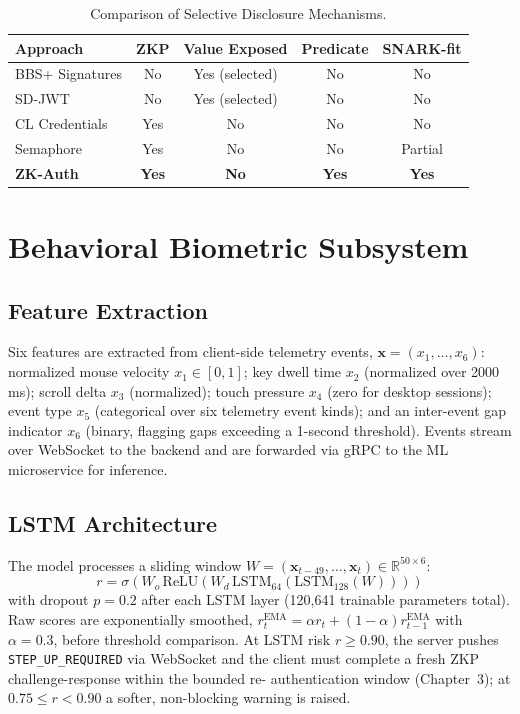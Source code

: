 \documentclass[12pt,a4paper,oneside]{report}
\begin{document}
\begin{table}[htbp]
\renewcommand{\arraystretch}{1.2}
\caption{Comparison of Selective Disclosure Mechanisms.}
\label{tab:disclosure}
\centering
\begin{tabular}{lcccc}
\toprule
\textbf{Approach} & \textbf{ZKP} & \textbf{Value Exposed} & \textbf{Predicate} & \textbf{SNARK-fit} \\
\midrule
BBS+ Signatures  & No  & Yes (selected) & No  & No \\
SD-JWT           & No  & Yes (selected) & No  & No \\
CL Credentials   & Yes & No             & No  & No \\
Semaphore        & Yes & No             & No  & Partial \\
\textbf{ZK-Auth} & \textbf{Yes} & \textbf{No} & \textbf{Yes} & \textbf{Yes} \\
\bottomrule
\end{tabular}
\end{table}

\section{Behavioral Biometric Subsystem}

\subsection{Feature Extraction}

Six features are extracted from client-side telemetry events,
$\mathbf{x} = (x_1, \ldots, x_6)$: normalized mouse velocity
$x_1 \in [0,1]$; key dwell time $x_2$ (normalized over 2000\,ms); scroll
delta $x_3$ (normalized); touch pressure $x_4$ (zero for desktop
sessions); event type $x_5$ (categorical over six telemetry event kinds);
and an inter-event gap indicator $x_6$ (binary, flagging gaps exceeding a
1-second threshold). Events stream over WebSocket to the backend and are
forwarded via gRPC to the ML microservice for inference.

\subsection{LSTM Architecture}

The model processes a sliding window
$W = (\mathbf{x}_{t-49}, \ldots, \mathbf{x}_t) \in \mathbb{R}^{50 \times 6}$:
\begin{equation}
  r = \sigma\!\left(W_o\,\text{ReLU}\!\left(W_d\,
    \text{LSTM}_{64}\!\left(\text{LSTM}_{128}(W)\right)\right)\right)
\end{equation}
with dropout $p=0.2$ after each LSTM layer (120,641 trainable parameters
total). Raw scores are exponentially smoothed,
$r_t^{\text{EMA}} = \alpha r_t + (1-\alpha) r_{t-1}^{\text{EMA}}$ with
$\alpha=0.3$, before threshold comparison. At LSTM risk $r \geq 0.90$, the
server pushes \texttt{STEP\_UP\_REQUIRED} via WebSocket and the client must
complete a fresh ZKP challenge-response within the bounded re-
authentication window (Chapter~3); at $0.75 \leq r < 0.90$ a softer,
non-blocking warning is raised.
\end{document}
